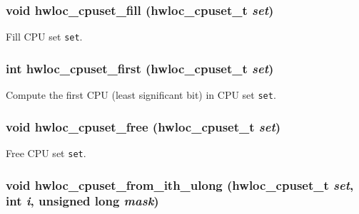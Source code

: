 \hypertarget{group__hwlocality__cpuset_gd1a6c02ae378aff412c2b843cf8cc3f4}{
\subsubsection[{hwloc\_\-cpuset\_\-fill}]{\setlength{\rightskip}{0pt plus 5cm}void hwloc\_\-cpuset\_\-fill ({\bf hwloc\_\-cpuset\_\-t} {\em set})}}
\label{group__hwlocality__cpuset_gd1a6c02ae378aff412c2b843cf8cc3f4}


Fill CPU set {\tt set}. 

\hypertarget{group__hwlocality__cpuset_g916c39218a447c7e2d2cabae004cf6fa}{
\subsubsection[{hwloc\_\-cpuset\_\-first}]{\setlength{\rightskip}{0pt plus 5cm}int hwloc\_\-cpuset\_\-first ({\bf hwloc\_\-cpuset\_\-t} {\em set})}}
\label{group__hwlocality__cpuset_g916c39218a447c7e2d2cabae004cf6fa}


Compute the first CPU (least significant bit) in CPU set {\tt set}. 

\hypertarget{group__hwlocality__cpuset_gf5d5a9e082a43f8311fdcff55e611b23}{
\subsubsection[{hwloc\_\-cpuset\_\-free}]{\setlength{\rightskip}{0pt plus 5cm}void hwloc\_\-cpuset\_\-free ({\bf hwloc\_\-cpuset\_\-t} {\em set})}}
\label{group__hwlocality__cpuset_gf5d5a9e082a43f8311fdcff55e611b23}


Free CPU set {\tt set}. 

\hypertarget{group__hwlocality__cpuset_ge681e6cd7486dbd03185a8760dc2fa5e}{
\subsubsection[{hwloc\_\-cpuset\_\-from\_\-ith\_\-ulong}]{\setlength{\rightskip}{0pt plus 5cm}void hwloc\_\-cpuset\_\-from\_\-ith\_\-ulong ({\bf hwloc\_\-cpuset\_\-t} {\em set}, \/  int {\em i}, \/  unsigned long {\em mask})}}
\label{group__hwlocality__cpuset_ge681e6cd7486dbd03185a8760dc2fa5e}


